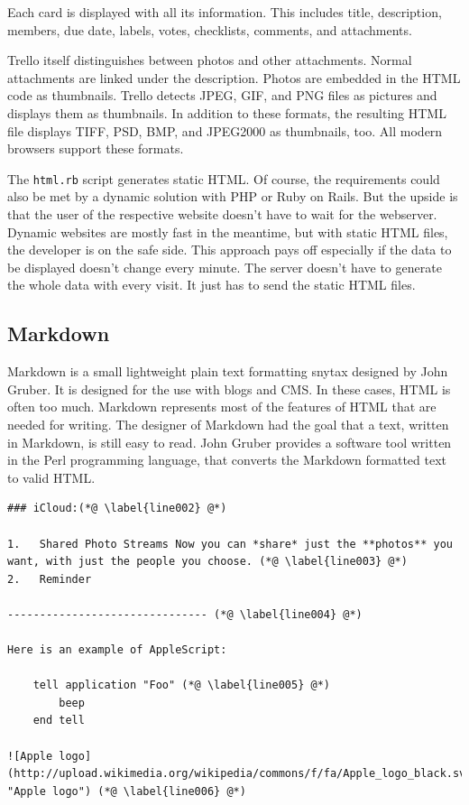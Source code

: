Each card is displayed with all its information. This includes title, description, members, due date, labels, votes, checklists, comments, and attachments.

Trello itself distinguishes between photos and other attachments. Normal attachments are linked under the description. Photos are embedded in the HTML code as thumbnails. Trello detects JPEG, GIF, and PNG files as pictures and displays them as thumbnails. In addition to these formats, the resulting HTML file displays TIFF, PSD, BMP, and JPEG2000 as thumbnails, too. All modern browsers support these formats.

The \texttt{html.rb} script generates static HTML. Of course, the requirements could also be met by a dynamic solution with PHP or Ruby on Rails. But the upside is that the user of the respective website doesn't have to wait for the webserver. Dynamic websites are mostly fast in the meantime, but with static HTML files, the developer is on the safe side. This approach pays off especially if the data to be displayed doesn't change every minute. The server doesn't have to generate the whole data with every visit. It just has to send the static HTML files.

\subsection{Markdown}
Markdown is a small lightweight plain text formatting snytax designed by John Gruber. It is designed for the use with blogs and CMS. In these cases, HTML is often too much. Markdown represents most of the features of HTML that are needed for writing. The designer of Markdown had the goal that a text, written in Markdown, is still easy to read. John Gruber provides a software tool written in the Perl programming language, that converts the Markdown formatted text to valid HTML. \cite{markdown}

\begin{lstlisting}[aboveskip=1\baselineskip, style=bash, caption=Example for a text written in Markdown., label=listing006]
### iCloud:(*@ \label{line002} @*)

1.   Shared Photo Streams Now you can *share* just the **photos** you want, with just the people you choose. (*@ \label{line003} @*)
2.   Reminder

------------------------------- (*@ \label{line004} @*)

Here is an example of AppleScript:

    tell application "Foo" (*@ \label{line005} @*)
        beep
    end tell

![Apple logo](http://upload.wikimedia.org/wikipedia/commons/f/fa/Apple_logo_black.svg "Apple logo") (*@ \label{line006} @*)
\end{lstlisting}


